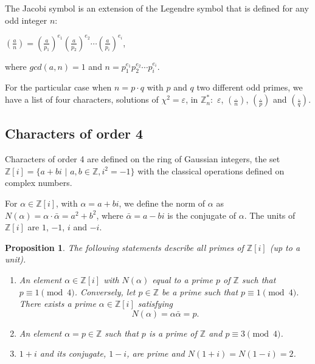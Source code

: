 \documentclass[11pt, a4paper, twoside, openright]{report}
\newtheorem{proposition}{Proposition}
\begin{document}
 			The Jacobi symbol is an extension of the Legendre symbol that is defined for any odd integer $n$:
 		 		
 		\hspace{30mm} $(\frac{a}{n}) = (\frac{a}{p_1})^{e_1} (\frac{a}{p_2})^{e_2} \cdots (\frac{a}{p_i})^{e_i} $, 
 		 		
 		\bigskip
 		 		
 		\noindent where $gcd(a,n)=1$ and $n= p_1^{e_1}p_2^{e_2} \cdots p_i^{e_i}$. 
 		
 		For the particular case when $n= p\cdot q$ with $p$ and $q$ two different odd primes, we have a list of four characters,
 		 solutions of $\chi^2= \varepsilon$, in $\mathbb{Z}_n^*:$ $\varepsilon$, $(\frac{.}{n})$, $(\frac{.}{p})$ and $(\frac{.}{q})$. 

 	\subsection{Characters of order 4}
 		
 		Characters of order 4 are defined on the ring of Gaussian integers, the set $\mathbb{Z}[i]= \{ a + bi$  $|$  $a,b \in \mathbb{Z}, i^2=-1 \}$
 		with the classical operations defined on complex numbers.
 		
 		For $\alpha \in  \mathbb{Z}[i]$, with $\alpha = a + bi $, we define the norm of $\alpha$ as $N(\alpha)= \alpha \cdot \bar{\alpha} = a^2 + b^2$,
 		where $\bar{\alpha} = a - bi$ is the conjugate of $\alpha$. The units of $\mathbb{Z}[i]$ are $1$, $-1$, $i$ and $-i$.
 		
 		
 		\begin{proposition}
 			
 			The following statements describe all primes of $\mathbb{Z}[i]$ (up to a unit).
 		
 		\begin{enumerate}
 		\item An element $\alpha \in \mathbb{Z}[i]$ with $N(\alpha)$ equal to a prime $p$ of $\mathbb{Z}$ such that $p \equiv 1 \pmod{4}$.  
 		Conversely, let $p \in \mathbb{Z}$ be a prime such that $p \equiv 1 \pmod{4}$. There exists a prime $\alpha \in \mathbb{Z}[i]$ satisfying
 		\begin{equation*}
 		N(\alpha) = \alpha \bar{\alpha} = p.
 		\end{equation*}
 		\item An element $\alpha = p \in \mathbb{Z}$ such that $p$ is a prime of $\mathbb{Z}$ and $p \equiv 3 \pmod{4}$.
 		\item $1 + i$ and its conjugate, $1-i$, are prime and $N(1 + i) = N(1-i) = 2$.
 		\end{enumerate}
 		\end{proposition}
 		
\end{document}
